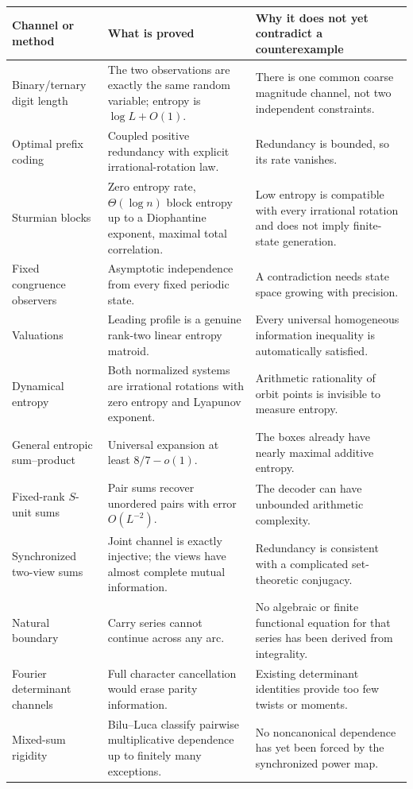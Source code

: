 \documentclass[11pt,oneside]{article}
\theoremstyle{definition}
\theoremstyle{remark}
\begin{document}
\begin{longtable}{p{}p{}p{}}
\toprule
\textbf{Channel or method} & \textbf{What is proved} & \textbf{Why it does not yet contradict a counterexample}\\
\midrule
Binary/ternary digit length & The two observations are exactly the same random variable; entropy is \(\log L+O(1)\). & There is one common coarse magnitude channel, not two independent constraints.\\
Optimal prefix coding & Coupled positive redundancy with explicit irrational-rotation law. & Redundancy is bounded, so its rate vanishes.\\
Sturmian blocks & Zero entropy rate, \(\Theta(\log n)\) block entropy up to a Diophantine exponent, maximal total correlation. & Low entropy is compatible with every irrational rotation and does not imply finite-state generation.\\
Fixed congruence observers & Asymptotic independence from every fixed periodic state. & A contradiction needs state space growing with precision.\\
Valuations & Leading profile is a genuine rank-two linear entropy matroid. & Every universal homogeneous information inequality is automatically satisfied.\\
Dynamical entropy & Both normalized systems are irrational rotations with zero entropy and Lyapunov exponent. & Arithmetic rationality of orbit points is invisible to measure entropy.\\
General entropic sum--product & Universal expansion at least \(8/7-o(1)\). & The boxes already have nearly maximal additive entropy.\\
Fixed-rank $S$-unit sums & Pair sums recover unordered pairs with error \(O(L^{-2})\). & The decoder can have unbounded arithmetic complexity.\\
Synchronized two-view sums & Joint channel is exactly injective; the views have almost complete mutual information. & Redundancy is consistent with a complicated set-theoretic conjugacy.\\
Natural boundary & Carry series cannot continue across any arc. & No algebraic or finite functional equation for that series has been derived from integrality.\\
Fourier determinant channels & Full character cancellation would erase parity information. & Existing determinant identities provide too few twists or moments.\\
Mixed-sum rigidity & Bilu--Luca classify pairwise multiplicative dependence up to finitely many exceptions. & No noncanonical dependence has yet been forced by the synchronized power map.\\
\bottomrule
\end{longtable}
\end{document}
